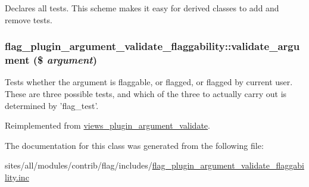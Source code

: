 Declares all tests. This scheme makes it easy for derived classes to add and remove tests. \hypertarget{classflag__plugin__argument__validate__flaggability_7a0ea8ffaee8f3d6d32956ce68dbd458}{
\subsubsection[{validate\_\-argument}]{\setlength{\rightskip}{0pt plus 5cm}flag\_\-plugin\_\-argument\_\-validate\_\-flaggability::validate\_\-argument (\$ {\em argument})}}
\label{classflag__plugin__argument__validate__flaggability_7a0ea8ffaee8f3d6d32956ce68dbd458}


Tests whether the argument is flaggable, or flagged, or flagged by current user. These are three possible tests, and which of the three to actually carry out is determined by 'flag\_\-test'. 

Reimplemented from \hyperlink{classviews__plugin__argument__validate}{views\_\-plugin\_\-argument\_\-validate}.

The documentation for this class was generated from the following file:\begin{CompactItemize}
\item 
sites/all/modules/contrib/flag/includes/\hyperlink{flag__plugin__argument__validate__flaggability_8inc}{flag\_\-plugin\_\-argument\_\-validate\_\-flaggability.inc}\end{CompactItemize}
